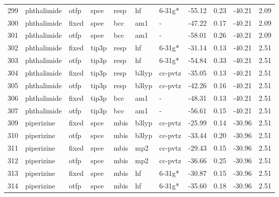 \begin{tabular}{lllllllrrrr}
299 &                   phthalimide &   otfp &   spce &   resp &      hf &       6-31g* &      -55.12 &     0.23 &      -40.21 &      2.09 \\
300 &                   phthalimide &  fixed &   spce &    bcc &     am1 &            - &      -47.22 &     0.17 &      -40.21 &      2.09 \\
301 &                   phthalimide &   otfp &   spce &    bcc &     am1 &            - &      -58.01 &     0.26 &      -40.21 &      2.09 \\
302 &                   phthalimide &  fixed &  tip3p &   resp &      hf &       6-31g* &      -31.14 &     0.13 &      -40.21 &      2.51 \\
303 &                   phthalimide &   otfp &  tip3p &   resp &      hf &       6-31g* &      -54.84 &     0.33 &      -40.21 &      2.51 \\
304 &                   phthalimide &  fixed &  tip3p &   resp &   b3lyp &      cc-pvtz &      -35.05 &     0.13 &      -40.21 &      2.51 \\
305 &                   phthalimide &   otfp &  tip3p &   resp &   b3lyp &      cc-pvtz &      -42.26 &     0.16 &      -40.21 &      2.51 \\
306 &                   phthalimide &  fixed &  tip3p &    bcc &     am1 &            - &      -48.31 &     0.13 &      -40.21 &      2.51 \\
307 &                   phthalimide &   otfp &  tip3p &    bcc &     am1 &            - &      -56.61 &     0.15 &      -40.21 &      2.51 \\
309 &                    piperizine &  fixed &   spce &   mbis &   b3lyp &      cc-pvtz &      -25.99 &     0.14 &      -30.96 &      2.51 \\
310 &                    piperizine &   otfp &   spce &   mbis &   b3lyp &      cc-pvtz &      -33.44 &     0.20 &      -30.96 &      2.51 \\
311 &                    piperizine &  fixed &   spce &   mbis &     mp2 &      cc-pvtz &      -29.43 &     0.15 &      -30.96 &      2.51 \\
312 &                    piperizine &   otfp &   spce &   mbis &     mp2 &      cc-pvtz &      -36.66 &     0.25 &      -30.96 &      2.51 \\
313 &                    piperizine &  fixed &   spce &   mbis &      hf &       6-31g* &      -30.87 &     0.15 &      -30.96 &      2.51 \\
314 &                    piperizine &   otfp &   spce &   mbis &      hf &       6-31g* &      -35.60 &     0.18 &      -30.96 &      2.51 \\

\end{tabular}

